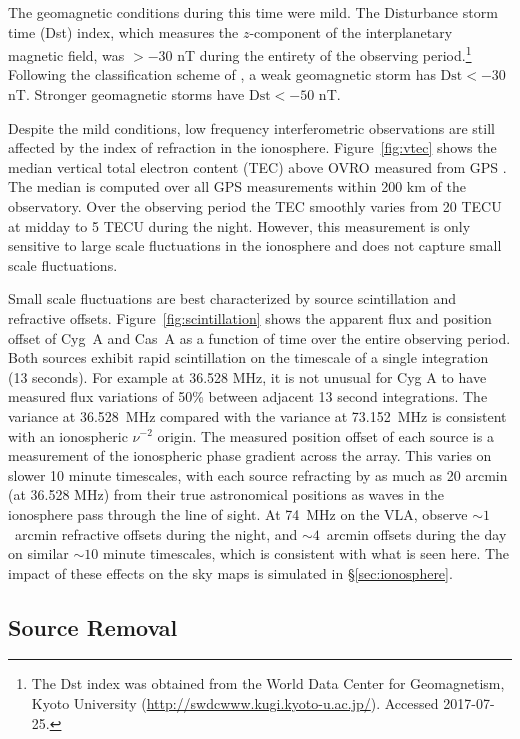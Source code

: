\documentclass[twocolumn]{aastex61}
\begin{document}
The geomagnetic conditions during this time were mild. The Disturbance storm time (Dst) index, which
measures the $z$-component of the interplanetary magnetic field, was
$>-30$ nT during the entirety of the observing period.\footnote{
    The Dst index was obtained from the World Data Center for Geomagnetism, Kyoto University
    (\url{http://swdcwww.kugi.kyoto-u.ac.jp/}). Accessed 2017-07-25.
}
Following the classification scheme of \citet{2008GMS...181.....K}, a weak geomagnetic storm has
$\text{Dst} < -30$ nT. Stronger geomagnetic storms have $\text{Dst} < -50$ nT.

Despite the mild conditions, low frequency interferometric observations are still affected by the
index of refraction in the ionosphere.  Figure~\ref{fig:vtec} shows the median vertical total
electron content (TEC) above OVRO measured from GPS \citep{1999JASTP..61.1205I}. The median is
computed over all GPS measurements within 200 km of the observatory. Over the observing period the
TEC smoothly varies from 20 TECU at midday to 5 TECU during the night. However, this measurement is
only sensitive to large scale fluctuations in the ionosphere and does not capture small scale
fluctuations.

Small scale fluctuations are best characterized by source scintillation and refractive offsets.
Figure~\ref{fig:scintillation} shows the apparent flux and position offset of Cyg~A and Cas~A as a
function of time over the entire observing period. Both sources exhibit rapid scintillation on the
timescale of a single integration (13 seconds). For example at 36.528 MHz, it is not unusual for Cyg
A to have measured flux variations of 50\% between adjacent 13 second integrations.  The variance at
36.528~MHz compared with the variance at 73.152~MHz is consistent with an ionospheric $\nu^{-2}$
origin. The measured position offset of each source is a measurement of the ionospheric phase
gradient across the array.  This varies on slower 10 minute timescales, with each source refracting
by as much as 20 arcmin (at 36.528 MHz) from their true astronomical positions as waves in the
ionosphere pass through the line of sight. At 74~MHz on the VLA, \citet{2007ApJS..172..686K} observe
$\sim 1$~arcmin refractive offsets during the night, and $\sim 4$~arcmin offsets during the day on
similar $\sim10$ minute timescales, which is consistent with what is seen here.  The impact of these
effects on the sky maps is simulated in \S\ref{sec:ionosphere}.

\subsection{Source Removal}\label{sec:source-removal}
\end{document}
